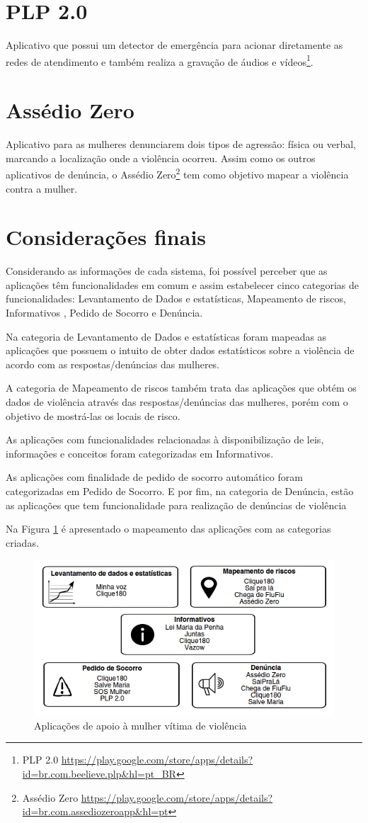\section*{PLP 2.0}

Aplicativo que possui um detector de emergência para acionar diretamente as redes de atendimento 
e também realiza a gravação de áudios e vídeos\footnote{PLP 2.0 \url{https://play.google.com/store/apps/details?id=br.com.beelieve.plp&hl=pt_BR}}.

\section*{Assédio Zero}

Aplicativo para as mulheres denunciarem dois tipos de agressão: física ou verbal, marcando a localização 
onde a violência ocorreu. Assim como os outros aplicativos de denúncia, o Assédio Zero\footnote{Assédio Zero \url{https://play.google.com/store/apps/details?id=br.com.assediozeroapp&hl=pt}} tem como objetivo mapear a violência contra a mulher.

\section{Considerações finais}

Considerando as informações de cada sistema, foi possível perceber que as aplicações têm funcionalidades
em comum e assim estabelecer cinco categorias de funcionalidades: Levantamento de Dados e estatísticas, Mapeamento de riscos, Informativos , Pedido de Socorro e Denúncia. 

Na categoria de Levantamento de Dados e estatísticas foram mapeadas as aplicações que possuem
o intuito de obter dados estatísticos sobre a violência de acordo com as respostas/denúncias das mulheres.

A categoria de Mapeamento de riscos também trata das aplicações que obtém os dados de violência através
das respostas/denúncias das mulheres, porém com o objetivo de mostrá-las os locais de risco.

As aplicações com funcionalidades relacionadas à disponibilização de leis, informações e conceitos foram
categorizadas em Informativos.

As aplicações com finalidade de pedido de socorro automático foram categorizadas em Pedido de Socorro. E por fim, na categoria de Denúncia, estão as aplicações que tem funcionalidade para realização de denúncias de violência

Na Figura \ref{fig:sistemas_categorizados} é apresentado o mapeamento das aplicações com as categorias criadas.

\begin{figure}[h!]
\centering
\includegraphics[scale=0.75]{figuras/sistemas_relacionados.png}
\caption{Aplicações de apoio à mulher vítima de violência}
\label{fig:sistemas_categorizados}
\end{figure}
